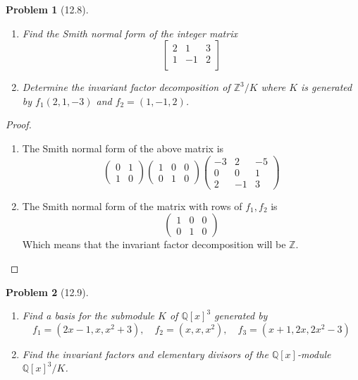 \documentclass[10pt]{article}
\newcommand{\sk}{\vskip 10mm}
\newcommand{\bb}[1]{\mathbb{#1}}
\theoremstyle{plain}
\newtheorem{problem}{Problem}
\theoremstyle{remark}
\begin{document}
\sk

\begin{problem}[12.8]
  \begin{enumerate}
  \item Find the Smith normal form of the integer matrix
    \[
      \left[
        \begin{array}{ccc}
          2&1&3\\
          1&-1&2\\
        \end{array}
      \right]
    \]
  \item Determine the invariant factor decomposition of $\bb{Z}^3/K$ where
    $K$ is generated by $f_1(2,1,-3)$ and $f_2=(1,-1,2)$.
  \end{enumerate}
\end{problem}

\begin{proof}
  \begin{enumerate}
  \item The Smith normal form of the above matrix is
    \[
      \left(
        \begin{array}{rr}
          0 & 1 \\
          1 & 0
        \end{array}
      \right)
      \left(
        \begin{array}{rrr}
          1 & 0 & 0 \\
          0 & 1 & 0
        \end{array}
      \right)
      \left(
        \begin{array}{rrr}
          -3 & 2 & -5 \\
          0 & 0 & 1 \\
          2 & -1 & 3
        \end{array}
      \right)
    \]
  \item The Smith normal form of the matrix with rows of $f_1,f_2$
    is
    \[
      \left(
        \begin{array}{ccc}
          1&0&0\\
          0&1&0
        \end{array}
      \right)
    \]
    Which means that the invariant factor decomposition will be
    $\bb{Z}$.
  \end{enumerate}
\end{proof}

\sk

\begin{problem}[12.9]
  \begin{enumerate}
  \item Find a basis for the submodule $K$ of $\bb{Q}[x]^3$ generated by
    \[ f_1=(2x-1,x,x^2+3),\quad f_2=(x,x,x^2),\quad f_3=(x+1,2x,2x^2-3)\]
  \item Find the invariant factors and elementary divisors of the
    $\bb{Q}[x]$-module $\bb{Q}[x]^3/K$.
  \end{enumerate}
\end{problem}
\end{document}
